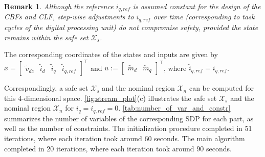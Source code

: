 \documentclass[lettersize,journal]{IEEEtran}
\newtheorem{remark}{Remark}
\begin{document}
\begin{remark}
   \textit{
      Although the reference $i_{q,ref}$ is assumed constant for the design of the CBFs and CLF, step-wise adjustments to $i_{q,ref}$ over time (corresponding to task cycles of the digital processing unit) do not compromise safety, provided the state remains within the safe set $\mathcal X_s$.
   }
\end{remark}

The corresponding coordinates of the states and inputs are given by $x = \begin{bmatrix}\tilde v_{dc} & \tilde i_d & \tilde i_q & \tilde i_{q,ref}\end{bmatrix}^\top$ and $u := \begin{bmatrix}\tilde m_d & \tilde m_q\end{bmatrix}^\top$, where $\tilde i_{q,ref} = i_{q,ref}$.

Correspondingly, a safe set $\mathcal X_s$ and the nominal region $\mathcal X_n$ can be computed for this 4-dimensional space.
\cref{fig:stream_plot}(c) illustrates the safe set $\mathcal X_s$ and the nominal region $\mathcal X_n$ for $i_q = i_{q,ref} = 0$.
\cref{tab:number_of_var_and_constr} summarizes the number of variables of the corresponding SDP for each part, as well as the number of constraints.
The initialization procedure completed in 51 iterations, where each iteration took around 60 seconds.
The main algorithm completed in 20 iterations, where each iteration took around 90 seconds.

\end{document}
